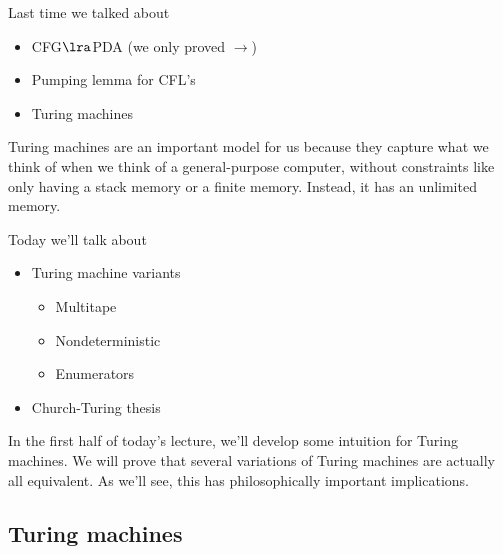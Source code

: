 
Last time we talked about
\begin{itemize}
\item
CFG$\lra$PDA (we only proved $\to$)
\item
Pumping lemma for CFL's
\item
Turing machines
\end{itemize}
Turing machines are an important model for us because they capture what we think of when we think of a general-purpose computer, without constraints like only having a stack memory or a finite memory. Instead, it has an unlimited memory.


Today we'll talk about
\begin{itemize}
\item Turing machine variants
\begin{itemize}
\item
Multitape
\item
Nondeterministic
\item
Enumerators
\end{itemize}
\item Church-Turing thesis
\end{itemize}
In the first half of today's lecture, we'll develop some intuition for Turing machines. We will prove that several variations of Turing machines are actually all equivalent. As we'll see, this has philosophically important implications.

\subsection{Turing machines}

